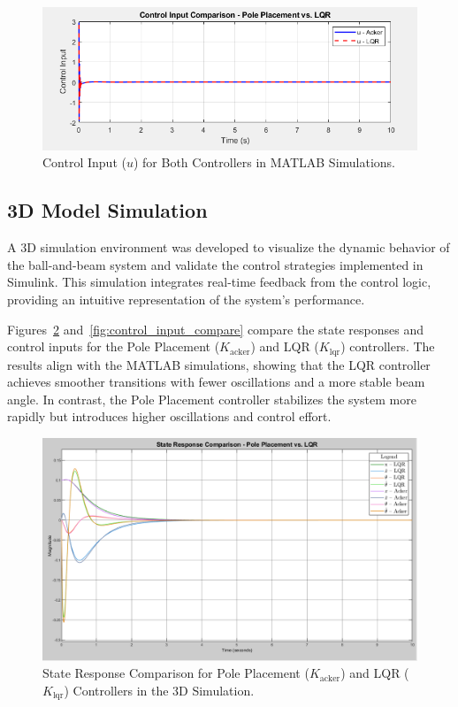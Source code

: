 \documentclass[conference]{IEEEtran}
\begin{document}
\begin{figure}[H]
    \centering
    \includegraphics[width=0.8\linewidth]{figures/control_input_sim.png}
    \caption{Control Input (\(u\)) for Both Controllers in MATLAB Simulations.}
    \label{fig:control_input_sim}
\end{figure}

\subsection{3D Model Simulation}
\label{subsec:3d_simulation}

A 3D simulation environment was developed to visualize the dynamic behavior of the ball-and-beam system and validate the control strategies implemented in Simulink. This simulation integrates real-time feedback from the control logic, providing an intuitive representation of the system's performance.

Figures~\ref{fig:state_compare} and~\ref{fig:control_input_compare} compare the state responses and control inputs for the Pole Placement (\(K_{\text{acker}}\)) and LQR (\(K_{\text{lqr}}\)) controllers. The results align with the MATLAB simulations, showing that the LQR controller achieves smoother transitions with fewer oscillations and a more stable beam angle. In contrast, the Pole Placement controller stabilizes the system more rapidly but introduces higher oscillations and control effort.

\begin{figure}[H]
    \centering
    \includegraphics[width=0.8\linewidth]{figures/states_compare_scope.png}
    \caption{State Response Comparison for Pole Placement (\(K_{\text{acker}}\)) and LQR (\(K_{\text{lqr}}\)) Controllers in the 3D Simulation.}
    \label{fig:state_compare}
\end{figure}
\end{document}
